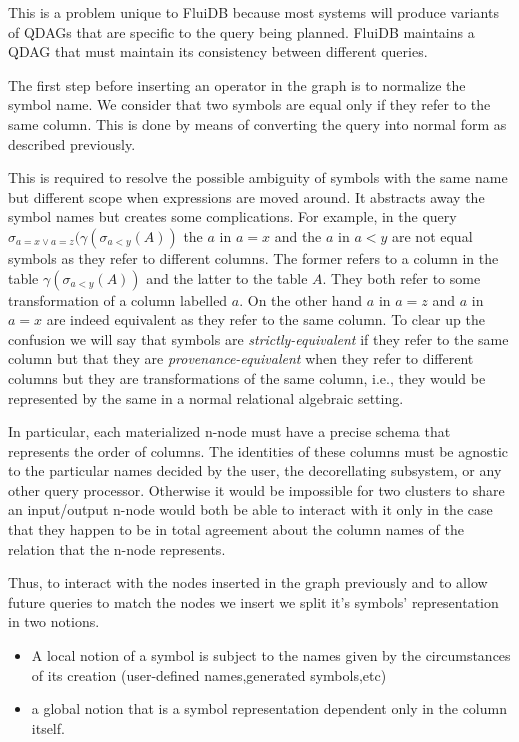 This is a problem unique to FluiDB because most systems will produce
variants of QDAGs that are specific to the query being planned. FluiDB
maintains a QDAG that must maintain its consistency between different
queries.

The first step before inserting an operator in the graph is to
normalize the symbol name. We consider that two symbols are equal only
if they refer to the same column. This is done by means of
converting the query into normal form as described previously.

This is required to resolve the possible ambiguity of symbols with the same name but different scope
when expressions are moved around. It abstracts away the symbol
names but creates some complications. For example, in the query
\(\sigma_{a=x \lor a=z}(\gamma(\sigma_{a<y}(A))\) the \(a\) in \(a=x\)
and the \(a\) in \(a < y\) are not equal symbols as they refer to
different columns. The former refers to a column in the table
\(\gamma(\sigma_{a<y}(A))\) and the latter to the table \(A\). They
both refer to some transformation of a column labelled \(a\). On the other hand \(a\) in \(a=z\) and \(a\) in \(a=x\) are
indeed equivalent as they refer to the same column. To clear up the
confusion we will say that symbols are \emph{strictly-equivalent} if
they refer to the same column but that they are
\emph{provenance-equivalent} when they refer to different columns but
they are transformations of the same column, i.e., they would be
represented by the same in a normal relational
algebraic setting. 

In particular, each materialized n-node must have a precise
schema that represents the order of columns. The identities of these
columns must be agnostic to the particular names decided by the user,
the decorellating subsystem, or any other query processor. Otherwise it
would be impossible for two clusters to share an input/output n-node
would both be able to interact with it only in the case that they
happen to be in total agreement about the column names of the relation
that the n-node represents.

Thus, to interact with the nodes inserted in the graph previously and
to allow future queries to match the nodes we insert we split it's
symbols' representation in two notions.

\begin{itemize}
\item A local notion of a symbol is subject to the names given by the
  circumstances of its creation (user-defined names,generated
  symbols,etc)
\item a global notion that is a symbol representation dependent only
  in the column itself.
\end{itemize}


